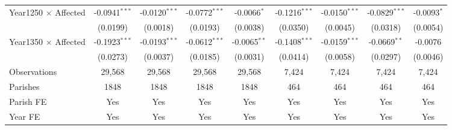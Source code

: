 \begin{tabular}{lcccccccc}
   Year1250 $\times$ Affected                       & -0.0941$^{***}$ & -0.0120$^{***}$ & -0.0772$^{***}$       & -0.0066$^{*}$          & -0.1216$^{***}$        & -0.0150$^{***}$        & -0.0829$^{***}$ & -0.0093$^{*}$\\   
                                                    & (0.0199)        & (0.0018)        & (0.0193)              & (0.0038)               & (0.0350)               & (0.0045)               & (0.0318)        & (0.0054)\\   
   Year1350 $\times$ Affected                       & -0.1923$^{***}$ & -0.0193$^{***}$ & -0.0612$^{***}$       & -0.0065$^{**}$         & -0.1408$^{***}$        & -0.0159$^{***}$        & -0.0669$^{**}$  & -0.0076\\   
                                                    & (0.0273)        & (0.0037)        & (0.0185)              & (0.0031)               & (0.0414)               & (0.0058)               & (0.0297)        & (0.0046)\\   
   \midrule
   Observations                                     & 29,568          & 29,568          & 29,568                & 29,568                 & 7,424                  & 7,424                  & 7,424          & 7,424\\  
   Parishes                                         & 1848            & 1848            & 1848                  & 1848                   & 464                    & 464                    & 464            & 464\\
   \midrule 
   Parish FE                                        & Yes             & Yes             & Yes                   & Yes                    & Yes                    & Yes                    & Yes            & Yes\\  
   Year FE                                          & Yes             & Yes             & Yes                   & Yes                    & Yes                    & Yes                    & Yes            & Yes\\
   \midrule \midrule
\end{tabular}
